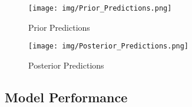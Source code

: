 \documentclass{article}
\begin{document}
\begin{figure}[H] %
    \centering
    \begin{minipage}[t]{0.48\textwidth}
        \centering
        \texttt{[image: img/Prior\_Predictions.png]}
        \caption{Prior Predictions}
        \label{fig:prior_predictions}
    \end{minipage}
    \hfill %
    \begin{minipage}[t]{0.48\textwidth}
        \centering
        \texttt{[image: img/Posterior\_Predictions.png]}
        \caption{Posterior Predictions}
        \label{fig:posterior_predictions}
    \end{minipage}
\end{figure}

\subsection{Model Performance}
\end{document}
